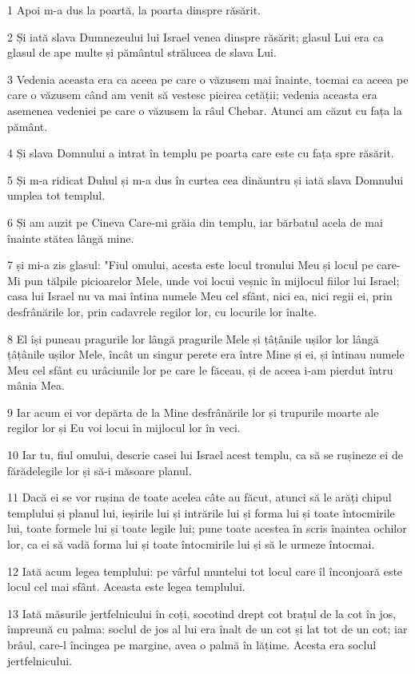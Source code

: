 \par 1 Apoi m-a dus la poartă, la poarta dinspre răsărit.
\par 2 Și iată slava Dumnezeului lui Israel venea dinspre răsărit; glasul Lui era ca glasul de ape multe și pământul strălucea de slava Lui.
\par 3 Vedenia aceasta era ca aceea pe care o văzusem mai înainte, tocmai ca aceea pe care o văzusem când am venit să vestesc pieirea cetății; vedenia aceasta era asemenea vedeniei pe care o văzusem la râul Chebar. Atunci am căzut cu fața la pământ.
\par 4 Și slava Domnului a intrat în templu pe poarta care este cu fața spre răsărit.
\par 5 Și m-a ridicat Duhul și m-a dus în curtea cea dinăuntru și iată slava Domnului umplea tot templul.
\par 6 Și am auzit pe Cineva Care-mi grăia din templu, iar bărbatul acela de mai înainte stătea lângă mine.
\par 7 și mi-a zis glasul: "Fiul omului, acesta este locul tronului Meu și locul pe care-Mi pun tălpile picioarelor Mele, unde voi locui veșnic în mijlocul fiilor lui Israel; casa lui Israel nu va mai întina numele Meu cel sfânt, nici ea, nici regii ei, prin desfrânările lor, prin cadavrele regilor lor, cu locurile lor înalte.
\par 8 El își puneau pragurile lor lângă pragurile Mele și țâțânile ușilor lor lângă țâțânile ușilor Mele, încât un singur perete era între Mine și ei, și întinau numele Meu cel sfânt cu urâciunile lor pe care le făceau, și de aceea i-am pierdut întru mânia Mea.
\par 9 Iar acum ei vor depărta de la Mine desfrânările lor și trupurile moarte ale regilor lor și Eu voi locui în mijlocul lor în veci.
\par 10 Iar tu, fiul omului, descrie casei lui Israel acest templu, ca să se rușineze ei de fărădelegile lor și să-i măsoare planul.
\par 11 Dacă ei se vor rușina de toate acelea câte au făcut, atunci să le arăți chipul templului și planul lui, ieșirile lui și intrările lui și forma lui și toate întocmirile lui, toate formele lui și toate legile lui; pune toate acestea în scris înaintea ochilor lor, ca ei să vadă forma lui și toate întocmirile lui și să le urmeze întocmai.
\par 12 Iată acum legea templului: pe vârful muntelui tot locul care îl înconjoară este locul cel mai sfânt. Aceasta este legea templului.
\par 13 Iată măsurile jertfelnicului în coți, socotind drept cot brațul de la cot în jos, împreună cu palma: soclul de jos al lui era înalt de un cot și lat tot de un cot; iar brâul, care-l încingea pe margine, avea o palmă în lățime. Acesta era soclul jertfelnicului.
